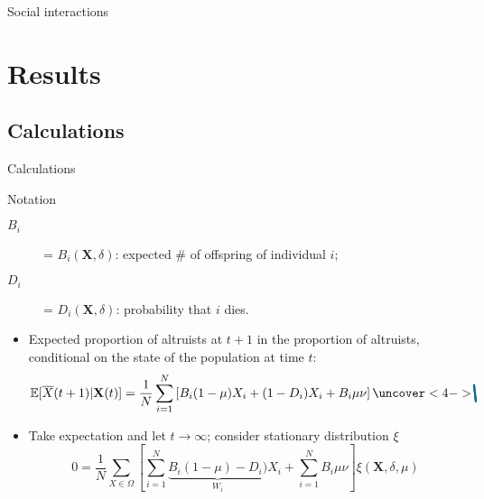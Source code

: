 \documentclass[aspectratio=169]{beamer}
\begin{document}
\begin{frame}{Social interactions}
\begin{block}
\begin{center}



\end{center}

\end{block}

\end{frame}







\section{Results}

\subsection{Calculations}


\begin{frame}{Calculations}
\begin{block}{Notation}
\begin{description}
\item[$B_i$] = $B_i(\mathbf{X}, \delta)$: expected \# of offspring of individual $i$;
\item[$D_i$] = $D_i(\mathbf{X}, \delta)$: probability that $i$ dies.
\end{description}
\end{block}
\pause
\begin{itemize}[<+->]
\item Expected proportion of altruists at $t+1$ in the proportion of altruists, conditional on the state of the population at time $t$:
%
\begin{displaymath}
\tikzmark{E1}\mathbb{E}[\overline{X}(t+1)|\mathbf{X}(t)]\tikzmark{E2} = \frac{1}{N}\sum_{i=1}^N \left[ B_i (1-\mu) X_i + (\tikzmark{O1}1\tikzmark{O2}-D_i)X_i + B_i \mu \nu \right] \uncover<4->{
\tikzstyle{stro}=[maincol, line width=1.5pt, line cap=round]
\tikz[remember picture, overlay]{ \draw[stro] (E1.north west)++(0,0.2) --(E2.south east);
\draw[stro] (O1.north west)++(0,0.2) --(O2.south east);
 }
}
\end{displaymath}

\item Take expectation and let $t\to \infty$; consider stationary distribution $\xi$
%
\begin{displaymath}
0 = \frac{1}{N} \sum_{X \in \Omega}\left[ \sum_{i=1}^N \underbrace{B_i (1-\mu) - D_i)}_{W_i} X_i + \sum_{i=1}^N B_i \mu \nu \right]\xi(\mathbf{X}, \delta, \mu)
\end{displaymath}
\end{itemize}
\end{frame}
\end{document}
